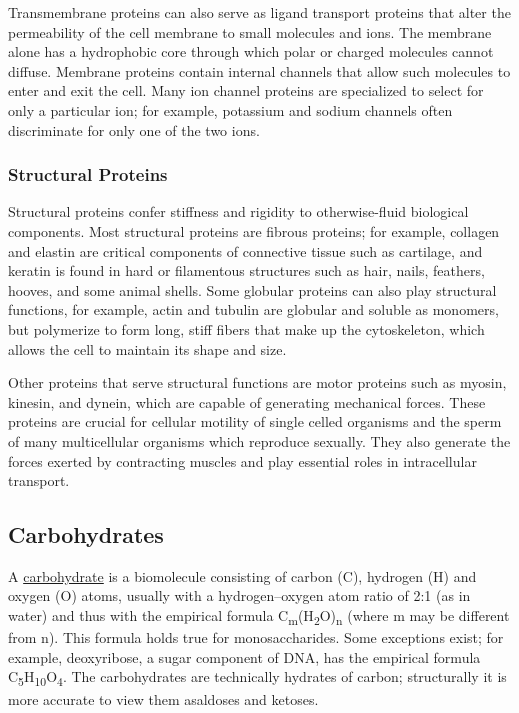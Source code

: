 Transmembrane proteins can also serve as ligand transport proteins that
alter the permeability of the cell membrane to small molecules and ions.
The membrane alone has a hydrophobic core through which polar or charged
molecules cannot diffuse. Membrane proteins contain internal channels
that allow such molecules to enter and exit the cell. Many ion channel
proteins are specialized to select for only a particular ion; for
example, potassium and sodium channels often discriminate for only one
of the two ions.

\hypertarget{structural-proteins}{%
\subsubsection{Structural Proteins}\label{structural-proteins}}

Structural proteins confer stiffness and rigidity to otherwise-fluid
biological components. Most structural proteins are fibrous proteins;
for example, collagen and elastin are critical components of connective
tissue such as cartilage, and keratin is found in hard or filamentous
structures such as hair, nails, feathers, hooves, and some animal
shells. Some globular proteins can also play structural functions, for
example, actin and tubulin are globular and soluble as monomers, but
polymerize to form long, stiff fibers that make up the cytoskeleton,
which allows the cell to maintain its shape and size.

Other proteins that serve structural functions are motor proteins such
as myosin, kinesin, and dynein, which are capable of generating
mechanical forces. These proteins are crucial for cellular motility of
single celled organisms and the sperm of many multicellular organisms
which reproduce sexually. They also generate the forces exerted by
contracting muscles and play essential roles in intracellular transport.

\hypertarget{carbohydrates}{%
\subsection{Carbohydrates}\label{carbohydrates}}

A \href{https://en.wikipedia.org/wiki/Carbohydrate}{carbohydrate} is a
biomolecule consisting of carbon (C), hydrogen (H) and oxygen (O) atoms,
usually with a hydrogen--oxygen atom ratio of 2:1 (as in water) and thus
with the empirical formula
C\textsubscript{m}(H\textsubscript{2}O)\textsubscript{n} (where m may be
different from n). This formula holds true for monosaccharides. Some
exceptions exist; for example, deoxyribose, a sugar component of DNA,
has the empirical formula
C\textsubscript{5}H\textsubscript{10}O\textsubscript{4}. The
carbohydrates are technically hydrates of carbon; structurally it is
more accurate to view them asaldoses and ketoses.


